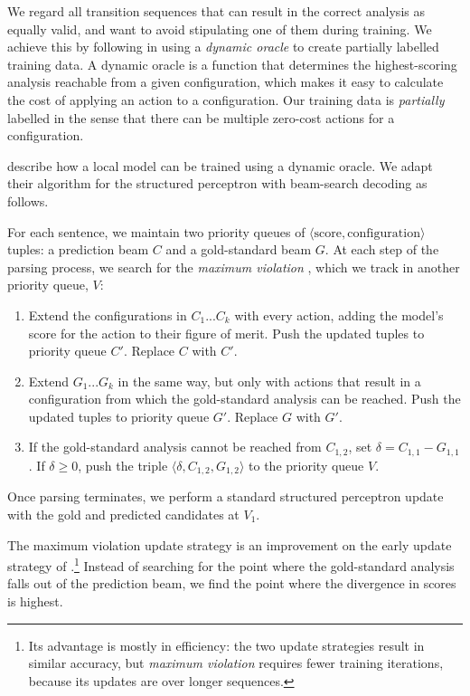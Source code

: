 \documentclass[11pt,letterpaper]{article}
\begin{document}
We regard all transition sequences that can result in the correct analysis as
equally valid, and want to avoid stipulating one of them during training.  
We achieve this by following \citet{goldberg:12} in using a
\emph{dynamic oracle} to create partially labelled training data. 
A dynamic oracle is a function that determines the highest-scoring analysis reachable
from a given configuration, which makes it easy to calculate the cost of applying
an action to a configuration.  Our training data is \emph{partially} labelled
in the sense that there can be multiple zero-cost actions for a configuration.

\citet{goldberg:12} describe how a local model can be trained using a dynamic
oracle.  We adapt their algorithm for the structured perceptron with beam-search
decoding as follows.

For each sentence, we maintain two priority queues of
$\langle \mathrm{score}, \mathrm{configuration} \rangle$ tuples: a prediction
beam $C$ and a gold-standard beam $G$.
At each step of the parsing process, we search for the \emph{maximum violation}
\citep{huang:12}, which we track in another priority queue, $V$:

\begin{enumerate}
\itemsep0em
\item Extend the configurations in $C_1...C_k$ with every action, adding the model's
    score for the action to their figure of merit. Push the updated tuples to
      priority queue $C'$. Replace $C$ with $C'$.
\item Extend $G_1...G_k$ in the same way, but only with actions that result in
    a configuration from which the gold-standard analysis can be reached.
      Push the updated tuples to priority queue $G'$. Replace $G$ with $G'$.
  \item If the gold-standard analysis cannot be reached from $C_{1,2}$, 
    set $\delta = C_{1,1} - G_{1,1}$. If $\delta \ge 0$, push the triple
    $\langle \delta, C_{1,2}, G_{1,2} \rangle$ to the priority queue $V$.
\end{enumerate}

Once parsing terminates, we perform a standard structured perceptron update
with the gold and predicted candidates at $V_1$.

The maximum violation update strategy is an improvement on the early update
strategy of \citet{collins:02}.\footnote{Its advantage is mostly in efficiency:
the two update strategies result in similar accuracy, but \emph{maximum violation}
requires fewer training iterations, because its updates are over longer sequences.}
Instead of searching for the point where the
gold-standard analysis falls out of the prediction beam, we find the point
where the divergence in scores is highest.
\end{document}
